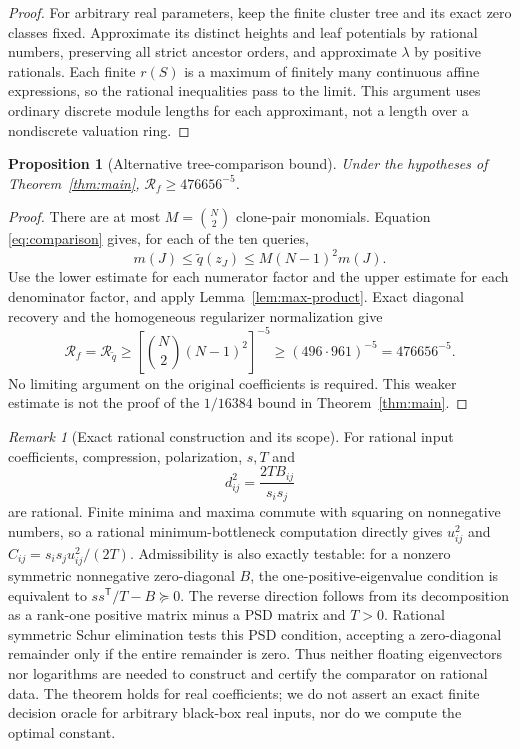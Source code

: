 \documentclass[11pt]{article}
\newtheorem{proposition}[theorem]{Proposition}
\theoremstyle{remark}
\newtheorem{remark}[theorem]{Remark}
\begin{document}
\begin{proof}
For arbitrary real parameters, keep the finite cluster tree and its exact
zero classes fixed.  Approximate its distinct heights and leaf potentials
by rational numbers, preserving all strict ancestor orders, and approximate
$\lambda$ by positive rationals.  Each finite $r(S)$ is a maximum of
finitely many continuous affine expressions, so the rational inequalities
pass to the limit.  This argument uses ordinary discrete module lengths for
each approximant, not a length over a nondiscrete valuation ring.
\end{proof}

\begin{proposition}[Alternative tree-comparison bound]
\label{prop:tree-bound}
Under the hypotheses of Theorem~\ref{thm:main},
$\mathcal R_f\ge476656^{-5}$.
\end{proposition}

\begin{proof}
There are at most $M=\binom N2$ clone-pair monomials.  Equation
\eqref{eq:comparison} gives, for each of the ten queries,
\[
 m(J)\leq\widetilde q(z_J)\leq M(N-1)^2m(J).
\]
Use the lower estimate for each numerator factor and the upper estimate for
each denominator factor, and apply Lemma~\ref{lem:max-product}.  Exact
diagonal recovery and the homogeneous regularizer normalization give
\[
 \mathcal R_f=\mathcal R_{\widetilde q}
 \geq\left[\binom N2(N-1)^2\right]^{-5}
 \geq(496\cdot961)^{-5}=476656^{-5}.
\]
No limiting argument on the original coefficients is required.
This weaker estimate is not the proof of the $1/16384$ bound in
Theorem~\ref{thm:main}.
\end{proof}

\begin{remark}[Exact rational construction and its scope]
\label{rem:rational}
For rational input coefficients, compression, polarization, $s,T$ and
\[
 d_{ij}^2=\frac{2TB_{ij}}{s_is_j}
\]
are rational.  Finite minima and maxima commute with squaring on nonnegative
numbers, so a rational minimum-bottleneck computation directly gives
$u_{ij}^2$ and $C_{ij}=s_is_ju_{ij}^2/(2T)$.  Admissibility is also exactly
testable: for a nonzero symmetric nonnegative zero-diagonal $B$, the
one-positive-eigenvalue condition is equivalent to
$ss^{\mathsf T}/T-B\succeq0$.  The reverse direction follows from its
decomposition as a rank-one positive matrix minus a PSD matrix and $T>0$.
Rational symmetric Schur elimination tests this PSD condition, accepting a
zero-diagonal remainder only if the entire remainder is zero.  Thus neither
floating eigenvectors nor logarithms are needed to construct and certify
the comparator on rational data.  The theorem holds for real coefficients;
we do not assert an exact finite decision oracle for arbitrary black-box
real inputs, nor do we compute the optimal constant.
\end{remark}
\end{document}
